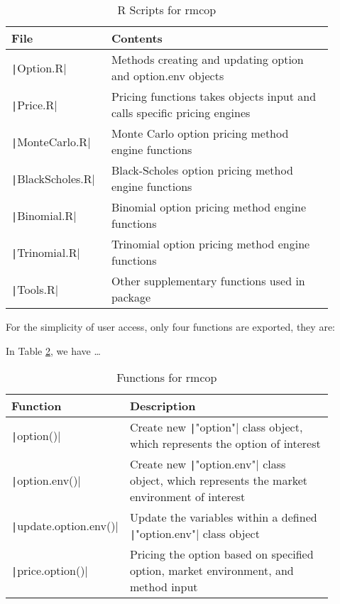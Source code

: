 \begin{table}[h] \label{tab:pkg_scripts}
\begin{tabular}{p{0.25\linewidth} | p{0.65\linewidth}}
File                           & Contents                                                                 \\ \hline
\texttt|Option.R|       & Methods creating and updating option and option.env objects              \\
\texttt|Price.R|        & Pricing functions takes objects input and calls specific pricing engines \\
\texttt|MonteCarlo.R|   & Monte Carlo option pricing method engine functions                       \\
\texttt|BlackScholes.R| & Black-Scholes option pricing method engine functions                     \\
\texttt|Binomial.R|     & Binomial option pricing method engine functions                          \\
\texttt|Trinomial.R|    & Trinomial option pricing method engine functions                         \\
\texttt|Tools.R|        & Other supplementary functions used in package                           
\end{tabular}
\caption{R Scripts for rmcop}
\end{table} 

For the simplicity of user access, only four functions are exported, they are:

In Table \ref{tab:pkg_functions}, we have \dots

\begin{table}[h] \label{tab:pkg_functions}
\begin{tabular}{p{0.25\linewidth} | p{0.65\linewidth}}
Function                            & Description                                                                                               \\ \hline
\texttt|option()|            & Create new \texttt|"option"| class object, which represents the option of interest                 \\
\texttt|option.env()|        & Create new \texttt|"option.env"| class object, which represents the market environment of interest \\
\texttt|update.option.env()| & Update the variables within a defined \texttt|"option.env"| class object                           \\
\texttt|price.option()|      & Pricing the option based on specified option, market environment, and method input                       
\end{tabular}
\caption{Functions for rmcop}
\end{table}



